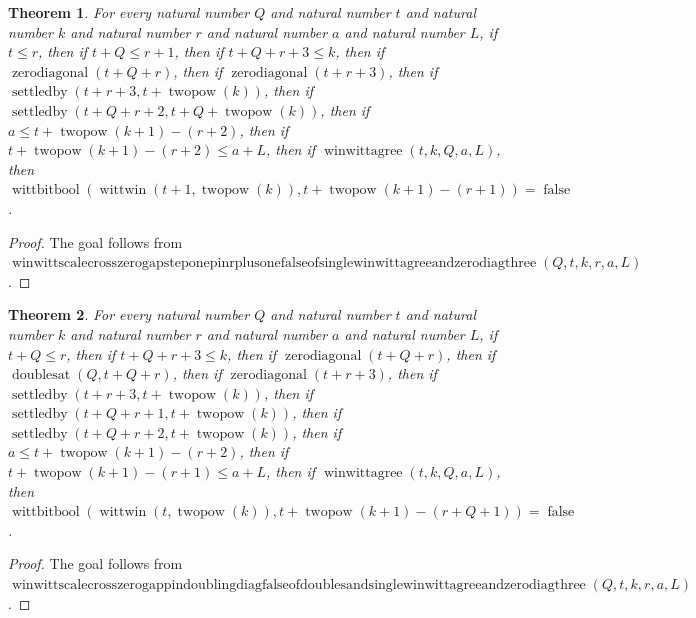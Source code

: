 \documentclass[11pt]{article}
\newtheorem{theorem}{Theorem}[section]
\theoremstyle{definition}
\begin{document}
\begin{theorem}
\label{ll:paper:winwitt-scale-cross-zero-gap-step-one-pin-r-plus-one-false-of-single-winwittagree-and-zero-diag-three}
For every natural number \(Q\) and natural number \(t\) and natural number \(k\) and natural number \(r\) and natural number \(a\) and natural number \(L\), if \(t \le r\), then if \(t + Q \le r + 1\), then if \(t + Q + r + 3 \le k\), then if \(\operatorname{zerodiagonal}(t + Q + r)\), then if \(\operatorname{zerodiagonal}(t + r + 3)\), then if \(\operatorname{settledby}(t + r + 3, t + \operatorname{twopow}(k))\), then if \(\operatorname{settledby}(t + Q + r + 2, t + Q + \operatorname{twopow}(k))\), then if \(a \le t + \operatorname{twopow}(k + 1) - (r + 2)\), then if \(t + \operatorname{twopow}(k + 1) - (r + 2) \le a + L\), then if \(\operatorname{winwittagree}(t, k, Q, a, L)\), then \(\operatorname{wittbitbool}(\operatorname{wittwin}(t + 1, \operatorname{twopow}(k)), t + \operatorname{twopow}(k + 1) - (r + 1)) = \operatorname{false}\).
\end{theorem}
\begin{proof}
The goal follows from \(\operatorname{winwittscalecrosszerogapsteponepinrplusonefalseofsinglewinwittagreeandzerodiagthree}(Q, t, k, r, a, L)\).
\end{proof}
\begin{theorem}
\label{ll:paper:winwitt-scale-cross-zero-gap-pin-doubling-diag-false-of-doubles-and-single-winwittagree-and-zero-diag-three}
For every natural number \(Q\) and natural number \(t\) and natural number \(k\) and natural number \(r\) and natural number \(a\) and natural number \(L\), if \(t + Q \le r\), then if \(t + Q + r + 3 \le k\), then if \(\operatorname{zerodiagonal}(t + Q + r)\), then if \(\operatorname{doublesat}(Q, t + Q + r)\), then if \(\operatorname{zerodiagonal}(t + r + 3)\), then if \(\operatorname{settledby}(t + r + 3, t + \operatorname{twopow}(k))\), then if \(\operatorname{settledby}(t + Q + r + 1, t + \operatorname{twopow}(k))\), then if \(\operatorname{settledby}(t + Q + r + 2, t + \operatorname{twopow}(k))\), then if \(a \le t + \operatorname{twopow}(k + 1) - (r + 2)\), then if \(t + \operatorname{twopow}(k + 1) - (r + 1) \le a + L\), then if \(\operatorname{winwittagree}(t, k, Q, a, L)\), then \(\operatorname{wittbitbool}(\operatorname{wittwin}(t, \operatorname{twopow}(k)), t + \operatorname{twopow}(k + 1) - (r + Q + 1)) = \operatorname{false}\).
\end{theorem}
\begin{proof}
The goal follows from \(\operatorname{winwittscalecrosszerogappindoublingdiagfalseofdoublesandsinglewinwittagreeandzerodiagthree}(Q, t, k, r, a, L)\).
\end{proof}
\end{document}
